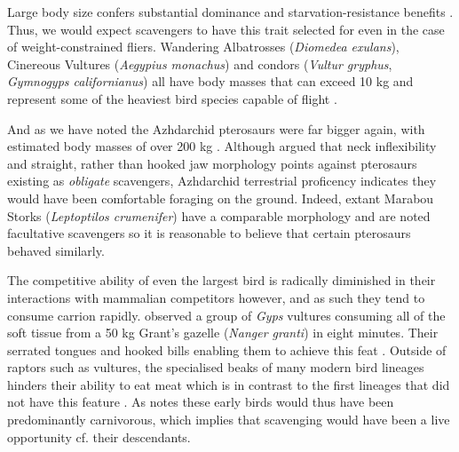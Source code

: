 \documentclass[a4paper,12pt]{article}
\begin{document}
Large body size confers substantial dominance and starvation-resistance benefits \citep{ruxton2004obligate}.
Thus, we would expect scavengers to have this trait selected for even in the case of weight-constrained fliers.
Wandering Albatrosses (\textit{Diomedea exulans}), Cinereous Vultures (\textit{Aegypius monachus}) and condors (\textit{Vultur gryphus}, \textit{Gymnogyps californianus}) all have body masses that can exceed 10 kg and represent some of the heaviest bird species capable of flight \citep{weimerskirch1992reproductive,ferguson2001raptors,donazar2002effects}.

And as we have noted the Azhdarchid pterosaurs were far bigger again, with estimated body masses of over 200 kg \citep{witton2010size}. Although \cite{witton2008reappraisal} argued that neck inflexibility and straight, rather than hooked jaw morphology points against pterosaurs existing as \textit{obligate} scavengers, Azhdarchid terrestrial proficency indicates they would have been comfortable foraging on the ground.
Indeed, extant Marabou Storks (\textit{Leptoptilos crumenifer}) 
have a comparable morphology and are noted facultative scavengers \citep{monadjem2012survival} so it is reasonable to believe that certain pterosaurs behaved similarly.

The competitive ability of even the largest bird is radically diminished in their interactions with mammalian competitors however, and as such they tend to consume carrion rapidly. 
\cite{houston1974role} observed a group of \textit{Gyps} vultures consuming all of the soft tissue from a 50 kg Grant’s gazelle (\textit{Nanger granti}) in eight minutes. 
Their serrated tongues and hooked bills enabling them to achieve this feat \citep{houston1975digestive}. 
Outside of raptors such as vultures, the specialised beaks of many modern bird lineages hinders their ability to eat meat which is in contrast to the first lineages that did not have this feature \citep{martyniuk2012field} . 
As \cite{martyniuk2012field} notes these early birds would thus have been predominantly carnivorous, which implies that scavenging would have been a live opportunity cf. their descendants. 
\end{document}
